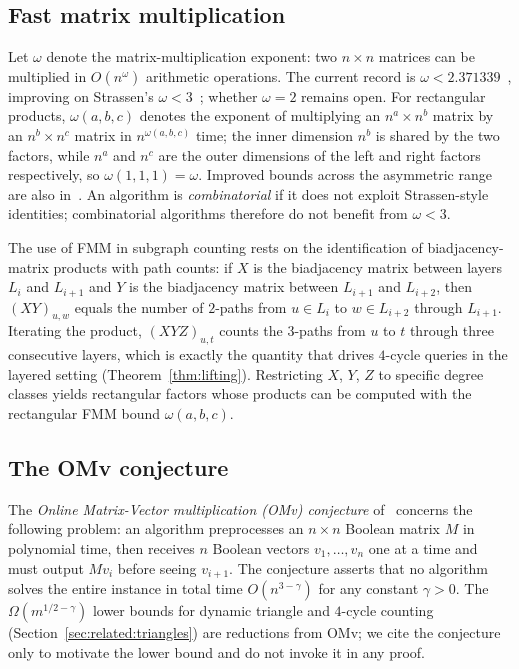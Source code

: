 \documentclass[sigconf,nonacm]{acmart}
\theoremstyle{plain}
\theoremstyle{definition}
\newcommand{\rfmm}[3]{\omega(#1,#2,#3)}
\begin{document}
\subsection{Fast matrix multiplication}
\label{sec:prelim:fmm}
Let $\omega$ denote the matrix-multiplication exponent: two $n
\times n$ matrices can be multiplied in $O(n^\omega)$ arithmetic
operations. The current record is $\omega < 2.371339$~\cite{ADW25},
improving on Strassen's $\omega < 3$~\cite{Strassen69}; whether
$\omega = 2$ remains open. For rectangular products,
$\rfmm{a}{b}{c}$ denotes the exponent of multiplying an $n^a \times
n^b$ matrix by an $n^b \times n^c$ matrix in $n^{\rfmm{a}{b}{c}}$
time; the inner dimension $n^b$ is shared by the two factors,
while $n^a$ and $n^c$ are the outer dimensions of the left and
right factors respectively, so $\rfmm{1}{1}{1} = \omega$. Improved
bounds across the asymmetric range are also in~\cite{ADW25}. An algorithm is
\emph{combinatorial} if it does not exploit Strassen-style
identities; combinatorial algorithms therefore do not benefit from
$\omega < 3$.

The use of FMM in subgraph counting rests on the
identification of biadjacency-matrix products with path counts: if
$X$ is the biadjacency matrix between layers $L_i$ and $L_{i+1}$
and $Y$ is the biadjacency matrix between $L_{i+1}$ and $L_{i+2}$,
then $(XY)_{u,w}$ equals the number of $2$-paths from $u\in L_i$ to
$w\in L_{i+2}$ through $L_{i+1}$. Iterating the product, $(XYZ)_{u,t}$
counts the $3$-paths from $u$ to $t$ through three consecutive
layers, which is exactly the quantity that drives $4$-cycle queries
in the layered setting (Theorem~\ref{thm:lifting}). Restricting
$X$, $Y$, $Z$ to specific degree classes yields rectangular factors
whose products can be computed with the rectangular FMM bound
$\rfmm{a}{b}{c}$.

\subsection{The OMv conjecture}
\label{sec:prelim:omv}
The \emph{Online Matrix-Vector multiplication (OMv) conjecture}
of~\cite{HKNS15} concerns the following problem: an algorithm
preprocesses an $n \times n$ Boolean matrix $M$ in polynomial time,
then receives $n$ Boolean vectors $v_1, \dots, v_n$ one at a time
and must output $M v_i$ before seeing $v_{i+1}$. The conjecture
asserts that no algorithm solves the entire instance in total time
$O(n^{3-\gamma})$ for any constant $\gamma > 0$. The
$\Omega(m^{1/2-\gamma})$ lower bounds for dynamic triangle and
$4$-cycle counting (Section~\ref{sec:related:triangles}) are
reductions from OMv; we cite the conjecture only to motivate the
lower bound and do not invoke it in any proof.
\end{document}
